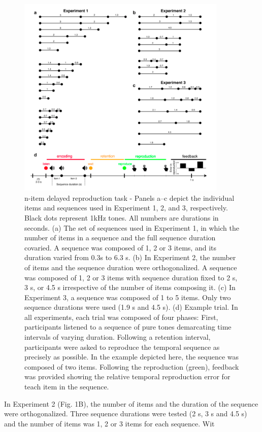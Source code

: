\begin{figure}[ht]
    \centering
    \includegraphics[width=10cm]{images_report/n-item delayed reproduction task.png}
    \caption[n-item delayed reproduction task]%
{n-item delayed reproduction task - Panels a–c depict the individual items and sequences used in Experiment 1, 2, and 3, respectively. Black dots represent 1kHz tones. All numbers are durations in seconds. (a) The set of sequences used in Experiment 1, in which the number of items in a sequence and the full sequence duration covaried. A sequence was composed of 1, 2 or 3 items, and its duration varied from 0.3s to 6.3 s. (b) In Experiment 2, the number of items and the sequence duration were orthogonalized. A sequence was composed of 1, 2 or 3 items with sequence duration fixed to 2 s, 3 s, or 4.5 s irrespective of the number of items composing it. (c) In Experiment 3, a sequence was composed of 1 to 5 items. Only two sequence durations were used (1.9 s and 4.5 s). (d) Example trial. In all experiments, each trial was composed of four phases: First, participants listened to a sequence of pure tones demarcating time intervals of varying duration. Following a retention interval, participants were asked to reproduce the temporal sequence as precisely as possible. In the example depicted here, the sequence was composed of two items. Following the reproduction (green), feedback was provided showing the relative temporal reproduction error for teach item in the sequence.}
    
    \label{paradigm}
\end{figure}

In Experiment 2 (Fig. 1B), the number of items and the duration of the sequence were orthogonalized. Three sequence durations were tested (2 s, 3 s and 4.5 s) and the number of items was 1, 2 or 3 items for each sequence. Wit

